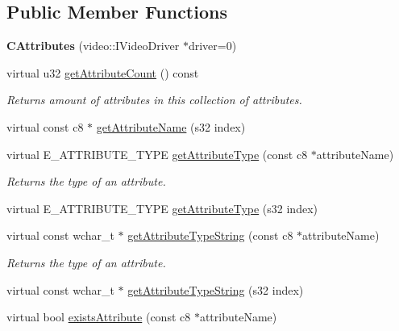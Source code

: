\subsection*{Public Member Functions}
\begin{DoxyCompactItemize}
\item 
\hypertarget{classirr_1_1io_1_1_c_attributes_a7dd496d35bc183ce2910087c304c1ef7}{{\bfseries C\-Attributes} (video\-::\-I\-Video\-Driver $\ast$driver=0)}\label{classirr_1_1io_1_1_c_attributes_a7dd496d35bc183ce2910087c304c1ef7}

\item 
virtual u32 \hyperlink{classirr_1_1io_1_1_c_attributes_ae6f7505478a0a0106b44597a17c9159c}{get\-Attribute\-Count} () const 
\begin{DoxyCompactList}\small\item\em Returns amount of attributes in this collection of attributes. \end{DoxyCompactList}\item 
virtual const c8 $\ast$ \hyperlink{classirr_1_1io_1_1_c_attributes_a6c94ed4da490d00a6612e8ea3925cdbf}{get\-Attribute\-Name} (s32 index)
\item 
virtual E\-\_\-\-A\-T\-T\-R\-I\-B\-U\-T\-E\-\_\-\-T\-Y\-P\-E \hyperlink{classirr_1_1io_1_1_c_attributes_a811d34d5b2cfba8863c8a75e5d002826}{get\-Attribute\-Type} (const c8 $\ast$attribute\-Name)
\begin{DoxyCompactList}\small\item\em Returns the type of an attribute. \end{DoxyCompactList}\item 
virtual E\-\_\-\-A\-T\-T\-R\-I\-B\-U\-T\-E\-\_\-\-T\-Y\-P\-E \hyperlink{classirr_1_1io_1_1_c_attributes_af59aa337ed1e86c7781ced593eacbf7c}{get\-Attribute\-Type} (s32 index)
\item 
virtual const wchar\-\_\-t $\ast$ \hyperlink{classirr_1_1io_1_1_c_attributes_a2570b742ad1c9a5a051179081439a545}{get\-Attribute\-Type\-String} (const c8 $\ast$attribute\-Name)
\begin{DoxyCompactList}\small\item\em Returns the type of an attribute. \end{DoxyCompactList}\item 
virtual const wchar\-\_\-t $\ast$ \hyperlink{classirr_1_1io_1_1_c_attributes_a43e2257da4c0ab6f8c37e30245630de7}{get\-Attribute\-Type\-String} (s32 index)
\item 
\hypertarget{classirr_1_1io_1_1_c_attributes_a4c71c0d38fc12dff77b6817d522b2a03}{virtual bool \hyperlink{classirr_1_1io_1_1_c_attributes_a4c71c0d38fc12dff77b6817d522b2a03}{exists\-Attribute} (const c8 $\ast$attribute\-Name)}\label{classirr_1_1io_1_1_c_attributes_a4c71c0d38fc12dff77b6817d522b2a03}


\end{DoxyCompactItemize}
